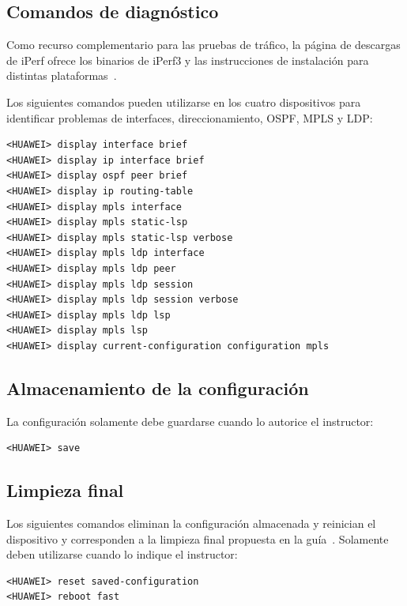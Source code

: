 \subsection{Comandos de diagnóstico}

Como recurso complementario para las pruebas de tráfico, la página de
descargas de iPerf ofrece los binarios de iPerf3 y las instrucciones de
instalación para distintas plataformas~\cite{gueant_iperf_2026}.

Los siguientes comandos pueden utilizarse en los cuatro dispositivos para
identificar problemas de interfaces, direccionamiento, OSPF, MPLS y LDP:

\begin{lstlisting}[style=terminal]
<HUAWEI> display interface brief
<HUAWEI> display ip interface brief
<HUAWEI> display ospf peer brief
<HUAWEI> display ip routing-table
<HUAWEI> display mpls interface
<HUAWEI> display mpls static-lsp
<HUAWEI> display mpls static-lsp verbose
<HUAWEI> display mpls ldp interface
<HUAWEI> display mpls ldp peer
<HUAWEI> display mpls ldp session
<HUAWEI> display mpls ldp session verbose
<HUAWEI> display mpls ldp lsp
<HUAWEI> display mpls lsp
<HUAWEI> display current-configuration configuration mpls
\end{lstlisting}

\subsection{Almacenamiento de la configuración}

La configuración solamente debe guardarse cuando lo autorice el instructor:

\begin{lstlisting}[style=terminal]
<HUAWEI> save
\end{lstlisting}

\subsection{Limpieza final}

Los siguientes comandos eliminan la configuración almacenada y reinician el
dispositivo y corresponden a la limpieza final propuesta en la guía~\cite[apartado~Cleanup]{guia-mpls-ar651-s6730h}. Solamente deben utilizarse cuando lo indique el instructor:

\begin{lstlisting}[style=terminal]
<HUAWEI> reset saved-configuration
<HUAWEI> reboot fast
\end{lstlisting}

